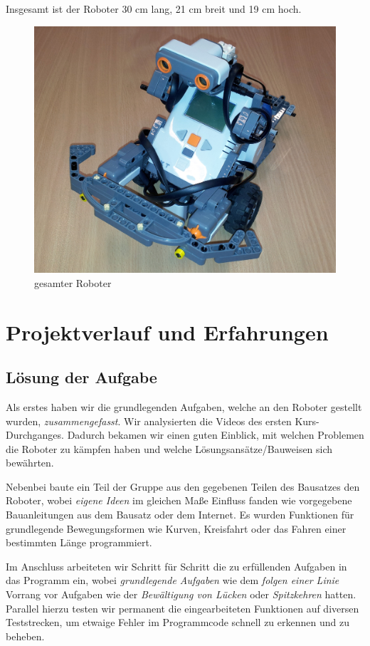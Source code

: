 \documentclass[a4paper]{article}
\begin{document}
\newpage

Insgesamt ist der Roboter 30 cm lang, 21 cm breit und 19 cm hoch.

\begin{figure}[h]
  \centering
  \caption{gesamter Roboter}
  \includegraphics[scale=0.15]{roboter_gesamt.jpg}
\end{figure}

\section{Projektverlauf und Erfahrungen}
\subsection{Lösung der Aufgabe}

Als erstes haben wir die grundlegenden Aufgaben, welche an den Roboter
gestellt wurden, \emph{zusammengefasst}. Wir analysierten die Videos
des ersten Kurs-Durchganges. Dadurch bekamen wir einen guten Einblick,
mit welchen Problemen die Roboter zu kämpfen haben und welche
Lösungsansätze/Bauweisen sich bewährten.

Nebenbei baute ein Teil der Gruppe aus den gegebenen Teilen des
Bausatzes den Roboter, wobei \emph{eigene Ideen} im gleichen Maße
Einfluss fanden wie vorgegebene Bauanleitungen aus dem Bausatz oder
dem Internet. Es wurden Funktionen für grundlegende Bewegungsformen
wie Kurven, Kreisfahrt oder das Fahren einer bestimmten Länge
programmiert.

Im Anschluss arbeiteten wir Schritt für Schritt die zu erfüllenden
Aufgaben in das Programm ein, wobei \emph{grundlegende Aufgaben} wie
dem \emph{folgen einer Linie} Vorrang vor Aufgaben wie der
\emph{Bewältigung von Lücken} oder \emph{Spitzkehren} hatten. Parallel
hierzu testen wir permanent die eingearbeiteten Funktionen auf
diversen Teststrecken, um etwaige Fehler im Programmcode schnell zu
erkennen und zu beheben.
\end{document}
